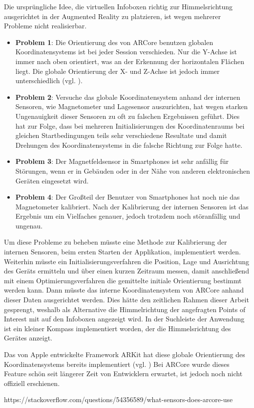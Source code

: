 Die ursprüngliche Idee, die virtuellen Infoboxen richtig zur Himmelsrichtung ausgerichtet in der Augmented Reality zu platzieren, ist wegen mehrerer Probleme nicht realisierbar.

\begin{itemize}

\item \textbf{Problem 1}: Die Orientierung des von ARCore benutzen globalen Koordinatensystems ist bei jeder Session verschieden. Nur die Y-Achse ist immer nach oben orientiert, was an der Erkennung der horizontalen Flächen liegt. Die globale Orientierung der X- und Z-Achse ist jedoch immer unterschiedlich (vgl. \cite{arcore_geo}).

\item \textbf{Problem 2}: Versuche das globale Koordinatensystem anhand der internen Sensoren, wie Magnetometer und Lagesensor auszurichten, hat wegen starken Ungenauigkeit dieser Sensoren zu oft zu falschen Ergebnissen geführt. Dies hat zur Folge, dass bei mehreren Initialisierungen des Koordinatenraums bei gleichen Startbedingungen teils sehr verschiedene Resultate und damit Drehungen des Koordinatensystems in die falsche Richtung zur Folge hatte. 

\item \textbf{Problem 3}: Der Magnetfeldsensor in Smartphones ist sehr anfällig für Störungen, wenn er in Gebäuden oder in der Nähe von anderen elektronischen Geräten eingesetzt wird.

\item \textbf{Problem 4}: Der Großteil der Benutzer von Smartphones hat noch nie das Magnetometer kalibriert. Nach der Kalibrierung der internen Sensoren ist das Ergebnis um ein Vielfaches genauer, jedoch trotzdem noch störanfällig und ungenau.
\end{itemize}

Um diese Probleme zu beheben müsste eine Methode zur Kalibrierung der internen Sensoren, beim ersten Starten der Applikation, implementiert werden. Weiterhin müsste ein Initialisierungsverfahren die Position, Lage und Ausrichtung des Geräts ermitteln und über einen kurzen Zeitraum messen, damit anschließend mit einem Optimierungsverfahren die gemittelte initiale Orientierung bestimmt werden kann. Dann müsste das interne Koordinatensystem von ARCore anhand dieser Daten ausgerichtet werden. Dies hätte den zeitlichen Rahmen dieser Arbeit gesprengt, weshalb als Alternative die Himmelrichtung der angefragten Points of Interest mit auf den Infoboxen angezeigt wird. In der Suchleiste der Anwendung ist ein kleiner Kompass implementiert worden, der die Himmelsrichtung des Gerätes anzeigt. 

Das von Apple entwickelte Framework ARKit hat diese globale Orientierung des Koordinatensystems bereits implementiert (vgl. \cite{arkit_global}) Bei ARCore wurde dieses Feature schön seit längerer Zeit von Entwicklern erwartet, ist jedoch noch nicht offiziell erschienen.

https://stackoverflow.com/questions/54356589/what-sensors-does-arcore-use







